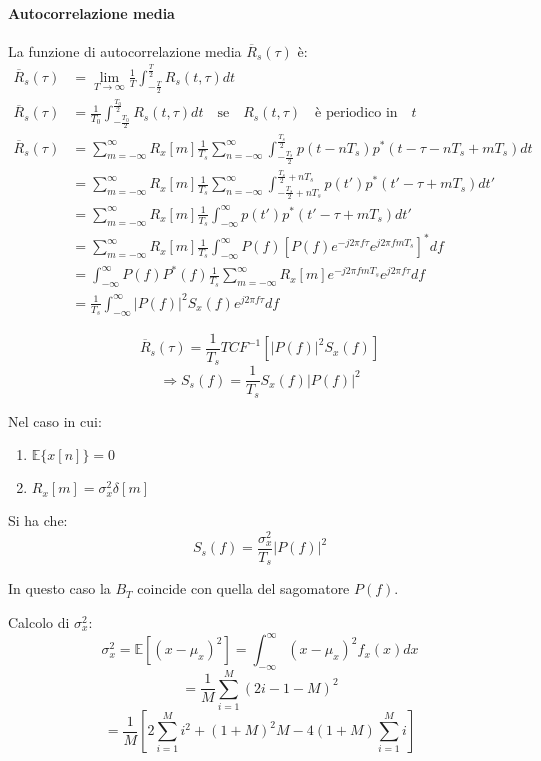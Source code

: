 \paragraph*{Autocorrelazione media}

La funzione di autocorrelazione media \( \overline{R}_s(\tau) \) è:
\begin{align*}
\overline{R}_s(\tau) &= \lim_{T\to\infty} \frac{1}{T} \int_{-\frac{T}{2}}^{\frac{T}{2}} R_s(t, \tau) dt \\
\overline{R}_s(\tau) &= \frac{1}{T_0} \int_{-\frac{T_0}{2}}^{\frac{T_0}{2}} R_s(t,\tau)dt \quad \text{se} \quad R_s(t,\tau) \quad \text{è periodico in} \quad t \\
\overline{R}_s(\tau) &= \sum_{m=-\infty}^{\infty} R_x[m] \frac{1}{T_s} \sum_{n=-\infty}^{\infty} \int_{-\frac{T_s}{2}}^{\frac{T_s}{2}} p(t-nT_s)p^*(t-\tau-nT_s+mT_s)dt \\
&= \sum_{m=-\infty}^{\infty} R_x[m] \frac{1}{T_s} \sum_{n=-\infty}^{\infty}\int_{-\frac{T_s}{2}+nT_s}^{\frac{T_s}{2}+nT_s} p(t')p^*(t'-\tau+mT_s)dt' \\
&= \sum_{m=-\infty}^{\infty} R_x[m] \frac{1}{T_s} \int_{-\infty}^{\infty} p(t')p^*(t'-\tau+mT_s)dt' \\
&= \sum_{m=-\infty}^{\infty} R_x[m] \frac{1}{T_s} \int_{-\infty}^{\infty} P(f)[P(f)e^{-j2\pi f\tau}e^{j2\pi fmT_s}]^*df \\
&= \int_{-\infty}^{\infty} P(f)P^*(f)\frac{1}{T_s} \sum_{m=-\infty}^{\infty} R_x[m] e^{-j2\pi fmT_s}e^{j2\pi f\tau}df \\
&= \frac{1}{T_s} \int_{-\infty}^{\infty} |P(f)|^2 S_x(f)e^{j2\pi f\tau}df
\end{align*}


\[
\overline{R}_s(\tau) = \frac{1}{T_s} TCF^{-1} \left[ |P(f)|^2 S_x(f) \right]
\]
\[
\Rightarrow S_s(f) = \frac{1}{T_s} S_x(f) |P(f)|^2
\]

Nel caso in cui:
\begin{enumerate}
  \item $\mathbb{E} \{ x[n] \} = 0$
  \item $R_x[m] = \sigma_x^2 \delta[m]$
\end{enumerate}

Si ha che:
\[
S_s(f) = \frac{\sigma_x^2}{T_s} |P(f)|^2
\]

In questo caso la $B_T$ coincide con quella del sagomatore $P(f)$.

Calcolo di $\sigma_x^2$:
\[
\sigma_x^2 = \mathbb{E} \left[ (x - \mu_x)^2 \right] = \int_{-\infty}^{\infty} (x - \mu_x)^2 f_x(x) dx
\]
\[
= \frac{1}{M} \sum_{i=1}^{M} (2i - 1 - M)^2
\]
\[
= \frac{1}{M} \left[ 2 \sum_{i=1}^{M} i^2 + (1+M)^2 M - 4(1+M) \sum_{i=1}^{M} i \right]
\]

